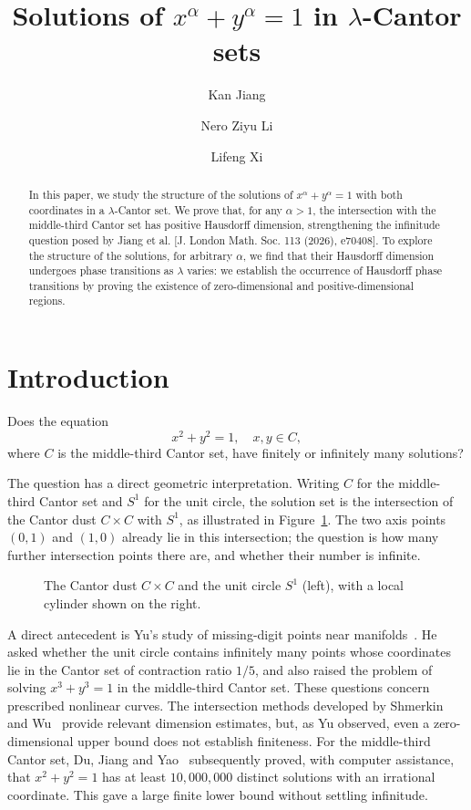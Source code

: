 \documentclass[11pt,a4paper]{amsart}
\title[Solutions in Cantor sets]{Solutions of $x^\alpha+y^\alpha=1$ in $\lambda$-Cantor sets}
\author{Kan Jiang}
\author{Nero Ziyu Li}
\author{Lifeng Xi}
\date{}
\numberwithin{equation}{section}
\theoremstyle{definition}
\begin{document}
\begin{abstract}
In this paper, we study the structure of the solutions of \(x^\alpha+y^\alpha=1\) with both
coordinates in a \(\lambda\)-Cantor set.
We prove that, for any \(\alpha>1\), the intersection with the middle-third Cantor
set has positive Hausdorff dimension, strengthening the infinitude question
posed by Jiang et al. [J. London Math. Soc. 113 (2026), e70408].
To explore the structure of the solutions, for arbitrary \(\alpha\), we find
that their Hausdorff dimension undergoes phase transitions as \(\lambda\)
varies: we establish the occurrence of Hausdorff phase transitions by proving the
existence of zero-dimensional and positive-dimensional regions.
\end{abstract}
\maketitle
\tableofcontents





\section{Introduction}\label{sec:introduction}

Does the equation
\[
x^2+y^2=1, \quad x,y \in C ,
\]
where $C$ is the middle-third Cantor set,
have finitely or infinitely many solutions?


The question has a direct geometric interpretation.
Writing \(C\) for the middle-third Cantor set and \(S^1\) for the unit
circle, the solution set is the intersection of the Cantor dust
\(C\times C\) with \(S^1\), as illustrated in Figure~\ref{fig:source}.
The two axis points \((0,1)\) and \((1,0)\) already lie in this
intersection; the question is how many further intersection points
there are, and whether their number is infinite.

\begin{figure}[htb]
\centering

\caption{The Cantor dust \(C\times C\) and the unit circle \(S^1\)
(left), with a local cylinder shown on the right.}
\label{fig:source}
\end{figure}

A direct antecedent is Yu's study of missing-digit points near
manifolds~\cite{Yu2023}. He asked whether the unit circle contains
infinitely many points whose coordinates lie in the Cantor set of
contraction ratio \(1/5\), and also raised the problem of solving
\(x^3+y^3=1\) in the middle-third Cantor set. These questions concern
prescribed nonlinear curves. The intersection methods developed by
Shmerkin~\cite{Shmerkin2019} and Wu~\cite{Wu2019} provide relevant
dimension estimates, but, as Yu observed, even a zero-dimensional
upper bound does not establish finiteness. For the middle-third Cantor
set, Du, Jiang and Yao~\cite{DuJiangYao2025} subsequently proved, with
computer assistance, that \(x^2+y^2=1\) has at least \(10,000,000\)
distinct solutions with an irrational coordinate. This gave a large
finite lower bound without settling infinitude.
\end{document}
